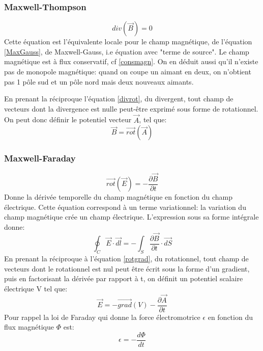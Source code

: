 \documentclass[10pt,a4paper]{article}
\begin{document}
\subsubsection{Maxwell-Thompson}
\begin{equation}
div(\overrightarrow{B}) = 0
\label{MaxThom}
\end{equation}
Cette équation est l'équivalente locale pour le champ magnétique, de l'équation \ref{MaxGauss}, de Maxwell-Gauss, i.e équation avec "terme de source". Le champ magnétique est à flux conservatif, cf \ref{consmagn}. On en déduit aussi qu'il n'existe pas de monopole magnétique: quand on coupe un aimant en deux, on n'obtient pas 1 pôle sud et un pôle nord mais deux nouveaux aimants.

En prenant la réciproque l'équation \ref{divrot}, du divergent, tout champ de vecteurs dont la divergence est nulle peut-être exprimé sous forme de rotationnel. On peut donc définir le potentiel vecteur $\overrightarrow{A}$, tel que:
\begin{equation}
\overrightarrow{B} = \overrightarrow{rot}(\overrightarrow{A})
\end{equation}

\subsubsection{Maxwell-Faraday}
\begin{equation}
\overrightarrow{rot}(\overrightarrow{E}) = - \frac{\partial\overrightarrow{B}}{\partial t}
\label{MaxFar}
\end{equation}
Donne la dérivée temporelle du champ magnétique en fonction du champ électrique. Cette équation correspond à un terme variationnel: la variation du champ magnétique crée un champ électrique. L'expression sous sa forme intégrale donne:
\begin{equation}
\oint_{C}\overrightarrow{E}\cdot\overrightarrow{dl} = - \int_{S}\frac{\partial\overrightarrow{B}}{\partial t}\cdot\overrightarrow{dS}
\end{equation}
En prenant la réciproque à l'équation \ref{rotgrad}, du rotationnel,  tout champ de vecteurs dont le rotationnel est nul peut être écrit sous la forme d'un gradient, puis en factorisant la dérivée par rapport à t, on définit un potentiel scalaire électrique V tel que:
\begin{equation}
\overrightarrow{E} = - \overrightarrow{grad}(V) - \frac{\partial\overrightarrow{A}}{\partial t}
\end{equation}
Pour rappel la loi de Faraday qui donne la force électromotrice $\epsilon$ en fonction du flux magnétique $\Phi$ est:
\begin{equation}
\epsilon = - \frac{d\Phi}{dt}
\end{equation}
\end{document}
